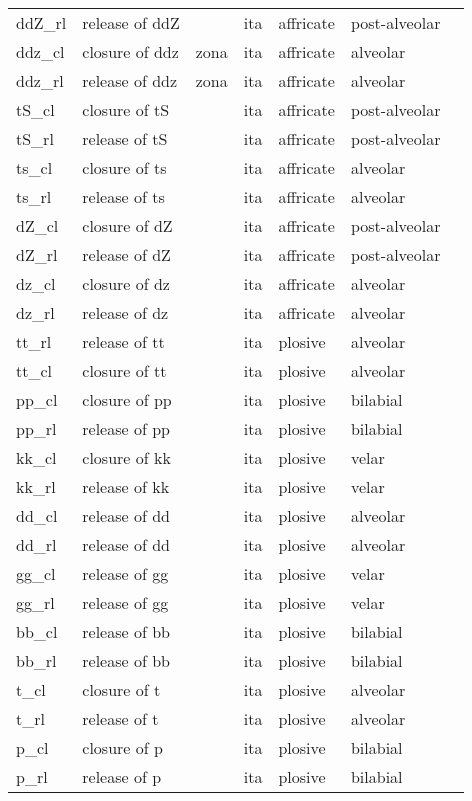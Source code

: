 \begin{longtable}{l|p{.3\linewidth}|p{.15\linewidth}|l|l|l|l}
	ddZ\_rl	& release of ddZ	& 	& ita	& affricate	& post-alveolar	\\
	ddz\_cl	& closure of ddz	& zona	& ita	& affricate	& alveolar	\\
	ddz\_rl	& release of ddz	& zona	& ita	& affricate	& alveolar	\\
	tS\_cl	& closure of tS	& 	& ita	& affricate	& post-alveolar	\\
	tS\_rl	& release of tS	& 	& ita	& affricate	& post-alveolar	\\
	ts\_cl	& closure of ts	& 	& ita	& affricate	& alveolar	\\
	ts\_rl	& release of ts	& 	& ita	& affricate	& alveolar	\\
	dZ\_cl	& closure of dZ	& 	& ita	& affricate	& post-alveolar	\\
	dZ\_rl	& release of dZ	& 	& ita	& affricate	& post-alveolar	\\
	dz\_cl	& closure of dz	& 	& ita	& affricate	& alveolar	\\
	dz\_rl	& release of dz	& 	& ita	& affricate	& alveolar	\\
	tt\_rl	& release of tt	& 	& ita	& plosive	& alveolar	\\
	tt\_cl	& closure of tt	& 	& ita	& plosive	& alveolar	\\
	pp\_cl	& closure of pp	& 	& ita	& plosive	& bilabial	\\
	pp\_rl	& release of pp	& 	& ita	& plosive	& bilabial	\\
	kk\_cl	& closure of kk	& 	& ita	& plosive	& velar	\\
	kk\_rl	& release of kk	& 	& ita	& plosive	& velar	\\
	dd\_cl	& release of dd	& 	& ita	& plosive	& alveolar	\\
	dd\_rl	& release of dd	& 	& ita	& plosive	& alveolar	\\
	gg\_cl	& release of gg	& 	& ita	& plosive	& velar	\\
	gg\_rl	& release of gg	& 	& ita	& plosive	& velar	\\
	bb\_cl	& release of bb	& 	& ita	& plosive	& bilabial	\\
	bb\_rl	& release of bb	& 	& ita	& plosive	& bilabial	\\
	t\_cl	& closure of t	& 	& ita	& plosive	& alveolar	\\
	t\_rl	& release of t	& 	& ita	& plosive	& alveolar	\\
	p\_cl	& closure of p	& 	& ita	& plosive	& bilabial	\\
	p\_rl	& release of p	& 	& ita	& plosive	& bilabial	\\

\end{longtable}
